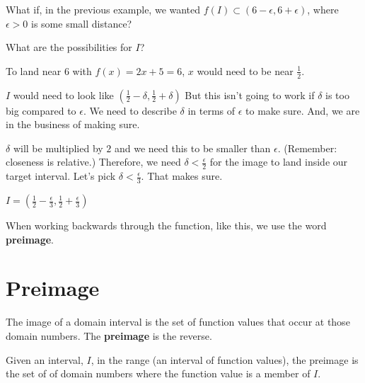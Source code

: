 \documentclass{ximera}
\begin{document}
What if, in the previous example, we wanted $f(I) \subset (6-\epsilon, 6+\epsilon)$, where $\epsilon > 0$ is some small distance?  


What are the possibilities for $I$?  







To land near $6$ with $f(x) = 2x + 5 = 6$, $x$ would need to be near $\frac{1}{2}$.  

$I$ would need to look like $\left( \frac{1}{2} - \delta, \frac{1}{2}+ \delta \right)$  But this isn't going to work if $\delta$ is too big compared to $\epsilon$.  We need to describe $\delta$ in terms of $\epsilon$ to make sure.  And, we are in the business of making sure. 



$\delta$ will be multiplied by $2$ and we need this to be smaller than $\epsilon$.  (Remember: closeness is relative.) Therefore, we need $\delta < \frac{\epsilon}{2}$ for the image to land inside our target interval.  Let's pick $\delta < \frac{\epsilon}{3}$.  That makes sure. 



$I = \left( \frac{1}{2} - \frac{\epsilon}{3}, \frac{1}{2} + \frac{\epsilon}{3} \right)$




When working backwards through the function, like this, we use the word \textbf{preimage}.



























\section*{Preimage}




The image of a domain interval is the set of function values that occur at those domain numbers.  The \textbf{preimage} is the reverse.  

Given an interval, $I$, in the range (an interval of function values), the preimage is the set of of domain numbers where the function value is a member of $I$.
\end{document}
